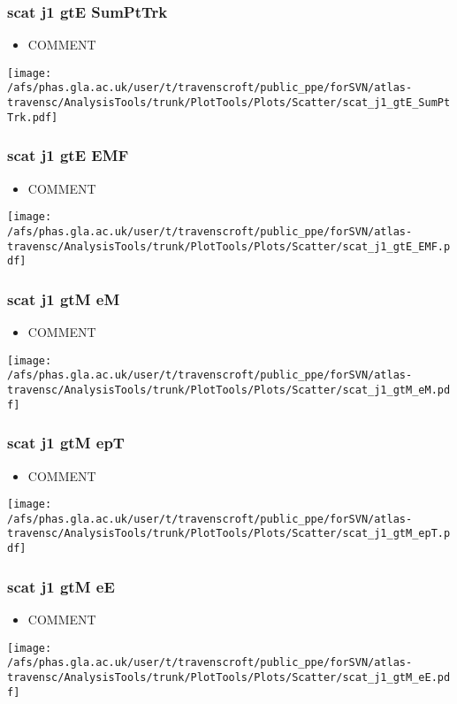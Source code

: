 \documentclass{beamer}
\begin{document}
\begin{frame}
\frametitle{scat j1 gtE SumPtTrk}
\begin{itemize}
\item COMMENT
\end{itemize}
\begin{center}
\texttt{[image: /afs/phas.gla.ac.uk/user/t/travenscroft/public\_ppe/forSVN/atlas-travensc/AnalysisTools/trunk/PlotTools/Plots/Scatter/scat\_j1\_gtE\_SumPtTrk.pdf]}
\end{center}
\end{frame}

\begin{frame}
\frametitle{scat j1 gtE EMF}
\begin{itemize}
\item COMMENT
\end{itemize}
\begin{center}
\texttt{[image: /afs/phas.gla.ac.uk/user/t/travenscroft/public\_ppe/forSVN/atlas-travensc/AnalysisTools/trunk/PlotTools/Plots/Scatter/scat\_j1\_gtE\_EMF.pdf]}
\end{center}
\end{frame}

\begin{frame}
\frametitle{scat j1 gtM eM}
\begin{itemize}
\item COMMENT
\end{itemize}
\begin{center}
\texttt{[image: /afs/phas.gla.ac.uk/user/t/travenscroft/public\_ppe/forSVN/atlas-travensc/AnalysisTools/trunk/PlotTools/Plots/Scatter/scat\_j1\_gtM\_eM.pdf]}
\end{center}
\end{frame}

\begin{frame}
\frametitle{scat j1 gtM epT}
\begin{itemize}
\item COMMENT
\end{itemize}
\begin{center}
\texttt{[image: /afs/phas.gla.ac.uk/user/t/travenscroft/public\_ppe/forSVN/atlas-travensc/AnalysisTools/trunk/PlotTools/Plots/Scatter/scat\_j1\_gtM\_epT.pdf]}
\end{center}
\end{frame}

\begin{frame}
\frametitle{scat j1 gtM eE}
\begin{itemize}
\item COMMENT
\end{itemize}
\begin{center}
\texttt{[image: /afs/phas.gla.ac.uk/user/t/travenscroft/public\_ppe/forSVN/atlas-travensc/AnalysisTools/trunk/PlotTools/Plots/Scatter/scat\_j1\_gtM\_eE.pdf]}
\end{center}
\end{frame}
\end{document}

